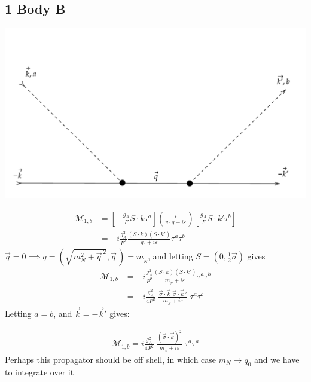 \documentclass[11pt]{article}
\newcommand{\note}[1]{\color{red} #1 \color{black}}
\newcommand\mm{\mathcal{M}}
\newcommand{\mn}{m_{{}_N}}
\begin{document}
\subsection{1 Body B}

\begin{center}
    \includegraphics[scale=0.6]{1b.pdf}
\end{center}
\begin{align}
    \mm_{1,b}&=\left[-\frac{g_A}{F} S\cdot k \tau^a \right]\left( \frac{i}{v\cdot q + i \varepsilon} \right)
    \left[ \frac{g_A}{F} S\cdot k' \tau^b \right]\\
             &= -i\frac{g_A^2}{F^2}  \frac{\left( S\cdot k \right) \left( S\cdot k' \right)}{q_0 +i \varepsilon}  \tau^a \tau^b
\end{align}
$\vec{q}=0\implies q=(\sqrt{m_N^2+\vec{q}^{\,2}}, \vec{q}\,)=\mn$, and letting $S=(0,\frac{1}{2} \vec{\sigma})$ gives
\begin{align}
    \mm_{1,b}&= -i\frac{g_A^2}{F^2}  \frac{\left( S\cdot k \right) \left( S\cdot k' \right)}{\mn +i \varepsilon}  \tau^a \tau^b\\
             &= -i\frac{g_A^2}{4F^2}\; \frac{ \vec{\sigma}\cdot \vec{k}\; \vec{\sigma}\cdot \vec{k}\,' }{\mn +i \varepsilon}\; \tau^a \tau^b
\end{align}
Letting $a=b$, and $\vec{k}=-\vec{k}'$ gives:

\begin{align}
    \mm_{1,b}= i\frac{g_A^2}{4F^2}\; \frac{\left(\vec{\sigma}\cdot \vec{k}\right)^2}{\mn +i \varepsilon}\; \tau^a \tau^a
\end{align}
\note{Perhaps this propagator should be off shell, in which case $m_N\to q_0$ and we have to integrate over it}
\newpage
\end{document}
